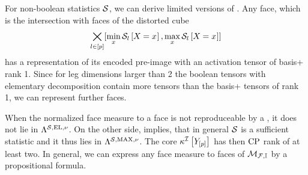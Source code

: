 \begin{remark}
    For non-boolean statistics $\mathcal{S}$, we can derive limited versions of .
    Any face, which is the intersection with faces of the distorted cube
    \begin{align*}
        \bigtimes_{l\in[p]} [\min_{x}\mathcal{S}_{l}\left[X_{}=x_{}\right],\max_{x}\mathcal{S}_{l}\left[X_{}=x_{}\right]]
    \end{align*}
    has a representation of its encoded pre-image with an activation tensor of basis+ rank 1.
    Since for leg dimensions larger than 2 the boolean tensors with elementary decomposition contain more tensors than the basis+ tensors of rank 1, we can represent further faces.
\end{remark}


When the normalized face measure to a face is not reproduceable by a \HardLogicNetwork{}, it does not lie in $\Lambda^{\mathcal{S},\mathrm{EL},\nu}$.
On the other side,  implies, that in general $\mathcal{S}$ is a sufficient statistic and it thus lies in $\Lambda^{\mathcal{S},\mathrm{MAX},\nu}$.
The core $\kappa^{\mathcal{I}}\left[Y_{[p]}\right]$ has then $\mathrm{CP}$ rank of at least two.
In general, we can express any face measure to faces of $\mathcal{M}_{\mathcal{F},\mathbb{I}}$ by a propositional formula.

